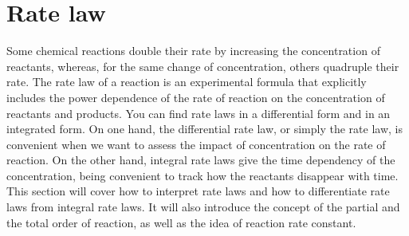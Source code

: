 \documentclass[main.tex]{subfiles}
\begin{document}
\section{Rate law}
Some chemical reactions double their rate by increasing the concentration of reactants, whereas, for the same change of concentration, others quadruple their rate. The rate law of a reaction is an experimental formula that explicitly includes the power dependence of the rate of reaction on the concentration of reactants and products. You can find rate laws in a differential form and in an integrated form. 
 On one hand, the differential rate law, or simply the rate law, is convenient when we want to assess the impact of concentration on the rate of reaction. On the other hand, integral rate laws give the time dependency of the concentration, being convenient to track how the reactants disappear with time. This section will cover how to interpret rate laws and how to differentiate rate laws from integral rate laws. It will also introduce the concept of the partial and the total order of reaction, as well as the idea of reaction rate constant.\sloppy 
\end{document}
